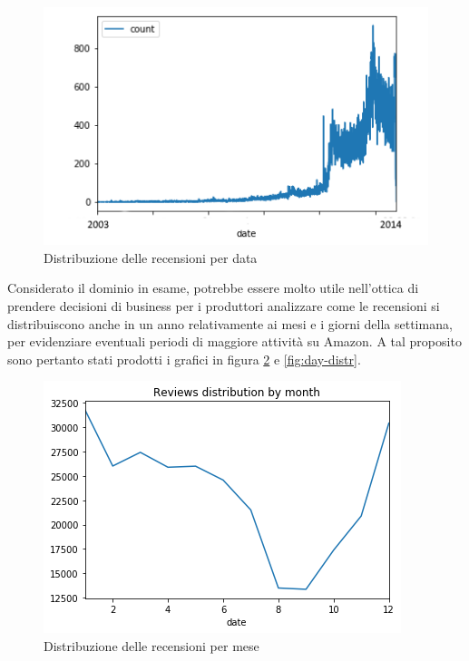 \documentclass[hidelinks, 12pt]{article}
\begin{document}
\begin{figure}[H]
	\centering
	\includegraphics[scale=0.7]{images/02_02_date_distr.png}
	\caption[Distribuzione delle recensioni per data]{Distribuzione delle recensioni per data}
	\label{fig:date-distr}
\end{figure}

\clearpage

Considerato il dominio in esame, potrebbe essere molto utile nell'ottica di prendere decisioni di business per i produttori analizzare come le recensioni si distribuiscono anche in un anno relativamente ai mesi e i giorni della settimana, per evidenziare eventuali periodi di maggiore attività su Amazon. A tal proposito sono pertanto stati prodotti i grafici in figura \ref{fig:month-distr} e \ref{fig:day-distr}.

\begin{figure}[H]
	\centering
	\includegraphics[scale=0.7]{images/02_03_month_distr.png}
	\caption[Distribuzione delle recensioni per mese]{Distribuzione delle recensioni per mese}
	\label{fig:month-distr}
\end{figure}
\end{document}
